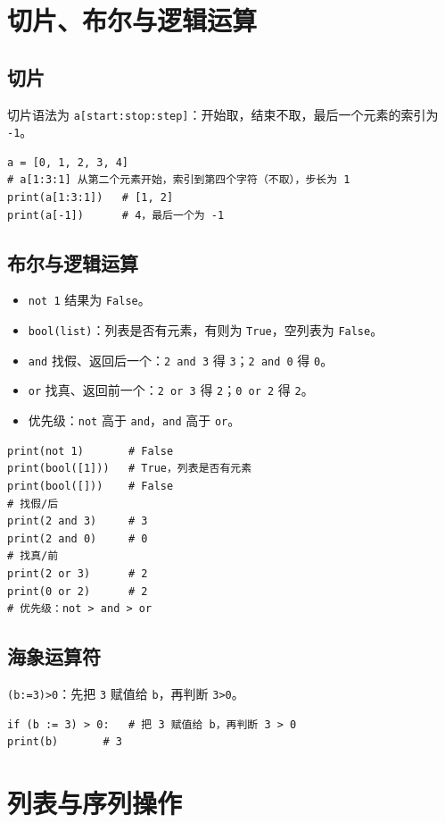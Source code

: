 \documentclass{article}
\begin{document}
\section{切片、布尔与逻辑运算}
\subsection{切片}
切片语法为 \texttt{a[start:stop:step]}：开始取，结束不取，最后一个元素的索引为 \texttt{-1}。
\begin{lstlisting}
a = [0, 1, 2, 3, 4]
# a[1:3:1] 从第二个元素开始，索引到第四个字符（不取），步长为 1
print(a[1:3:1])   # [1, 2]
print(a[-1])      # 4，最后一个为 -1
\end{lstlisting}

\subsection{布尔与逻辑运算}
\begin{itemize}
	\item \texttt{not 1} 结果为 \texttt{False}。
	\item \texttt{bool(list)}：列表是否有元素，有则为 \texttt{True}，空列表为 \texttt{False}。
	\item \texttt{and} 找假、返回后一个：\texttt{2 and 3} 得 \texttt{3}；\texttt{2 and 0} 得 \texttt{0}。
	\item \texttt{or} 找真、返回前一个：\texttt{2 or 3} 得 \texttt{2}；\texttt{0 or 2} 得 \texttt{2}。
	\item 优先级：\texttt{not} 高于 \texttt{and}，\texttt{and} 高于 \texttt{or}。
\end{itemize}
\begin{lstlisting}
print(not 1)       # False
print(bool([1]))   # True，列表是否有元素
print(bool([]))    # False
# 找假/后
print(2 and 3)     # 3
print(2 and 0)     # 0
# 找真/前
print(2 or 3)      # 2
print(0 or 2)      # 2
# 优先级：not > and > or
\end{lstlisting}

\subsection{海象运算符}
\texttt{(b:=3)>0}：先把 \texttt{3} 赋值给 \texttt{b}，再判断 \texttt{3>0}。
\begin{lstlisting}
if (b := 3) > 0:   # 把 3 赋值给 b，再判断 3 > 0
print(b)       # 3
\end{lstlisting}

\section{列表与序列操作}
\end{document}
